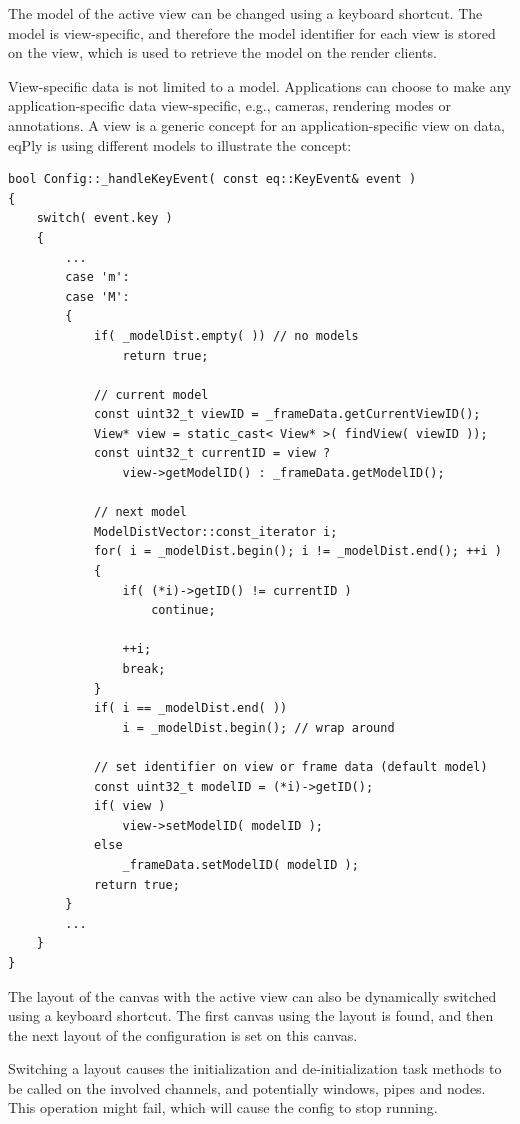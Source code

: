 \documentclass[10pt,a4]{scrartcl}
\begin{document}
The model of the active view can be changed using a keyboard
shortcut. The model is view-specific, and therefore the model identifier
for each view is stored on the view, which is used to retrieve the model
on the render clients. 

View-specific data is not limited to a model. Applications can choose to
make any application-specific data view-specific, e.g., cameras,
rendering modes or annotations. A view is a generic concept for an
application-specific view on data, \textsf{eqPly} is using different
models to illustrate the concept:

{\footnotesize\begin{lstlisting}
bool Config::_handleKeyEvent( const eq::KeyEvent& event )
{
    switch( event.key )
    {
        ...
        case 'm':
        case 'M':
        {
            if( _modelDist.empty( )) // no models
                return true;

            // current model
            const uint32_t viewID = _frameData.getCurrentViewID();
            View* view = static_cast< View* >( findView( viewID ));
            const uint32_t currentID = view ? 
                view->getModelID() : _frameData.getModelID();

            // next model
            ModelDistVector::const_iterator i;
            for( i = _modelDist.begin(); i != _modelDist.end(); ++i )
            {
                if( (*i)->getID() != currentID )
                    continue;
                
                ++i;
                break;
            }
            if( i == _modelDist.end( ))
                i = _modelDist.begin(); // wrap around
            
            // set identifier on view or frame data (default model)
            const uint32_t modelID = (*i)->getID();
            if( view )
                view->setModelID( modelID );
            else
                _frameData.setModelID( modelID );
            return true;
        }
        ...
    }
}
\end{lstlisting}}

The layout of the canvas with the active view can also be dynamically
switched using a keyboard shortcut. The first canvas using the layout is
found, and then the next layout of the configuration is set on this
canvas. 

Switching a layout causes the initialization and de-initialization task
methods to be called on the involved channels, and potentially windows,
pipes and nodes. This operation might fail, which will cause the config
to stop running.
\end{document}
